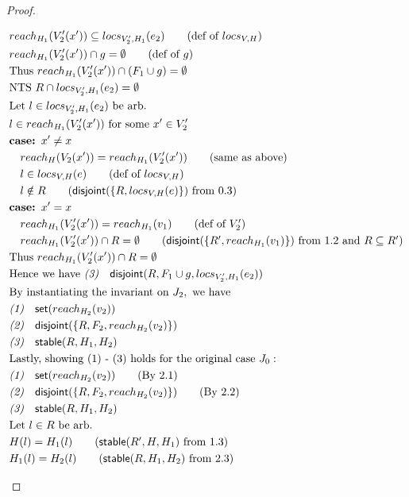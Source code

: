 \documentclass[sigconf]{acmart}
\newcommand{\ms}[1]{\ensuremath{\mathsf{#1}}}
\newcommand{\stable}[1]{\mathsf{stable}(#1)}
\newcommand{\dist}[1]{\mathsf{disjoint}(#1)}
\theoremstyle{definition}
\begin{document}
\begin{proof}
\begin{description}
\begin{align*}
  &reach_{H_1}(V_2'(x')) \subseteq locs_{V_2',H_1}(e_2) \tag{def of $locs_{V,H}$}\\
  &reach_{H_1}(V_2'(x')) \cap g = \emptyset \tag{def of $g$}\\
  &\text{Thus } reach_{H_1}(V_2'(x')) \cap (F_1 \cup g) = \emptyset\\
  &\text{NTS } R \cap locs_{V_2',H_1}(e_2) = \emptyset\\
  &\text{Let } l \in locs_{V_2',H_1}(e_2) \text{ be arb.}\\
  &l \in reach_{H_1}(V_2'(x')) \text{ for some } x' \in V_2'\\
  &\textbf{case: } x' \ne x\\
  &\quad reach_H(V_2(x')) = reach_{H_1}(V_2'(x')) \tag{same as above}\\
  &\quad l \in locs_{V,H}(e) \tag{def of $locs_{V,H}$}\\
  &\quad l \notin R \tag{$\dist{\{R,locs_{V,H}(e)\}}$ from 0.3}\\
  &\textbf{case: } x' = x\\
  &\quad reach_{H_1}(V_2'(x')) = reach_{H_1}(v_1) \tag{def of $V_2'$}\\
  &\quad reach_{H_1}(V_2'(x')) \cap R = \emptyset \tag{$\dist{\{R', reach_{H_1}(v_1)\}}$ from 1.2 and $R \subseteq R'$}\\
  &\text{Thus } reach_{H_1}(V_2'(x')) \cap R = \emptyset\\
  &\text{Hence we have }\emph{(3)}\quad \dist{R,F_1 \cup g,locs_{V_2',H_1}(e_2)}\\
  &\text{By instantiating the invariant on } J_2, \text{ we have }\\
  &\emph{(1)}\quad \ms{set}(reach_{H_2}(v_2))\\
  &\emph{(2)}\quad \dist{\{R,F_2,reach_{H_2}(v_2)\}}\\
  &\emph{(3)}\quad \stable{R,H_1,H_2}\\
  &\text{Lastly, showing (1) - (3) holds for the original case } J_0:\\
  &\emph{(1)}\quad \ms{set}(reach_{H_2}(v_2)) \tag{By 2.1}\\
  &\emph{(2)}\quad \dist{\{R,F_2,reach_{H_2}(v_2)\}} \tag{By 2.2}\\
  &\emph{(3)}\quad \stable{R,H_1,H_2}\\
  &\text{Let } l \in R \text{ be arb. }\\
  &H(l) = H_1(l) \tag{$\stable{R',H,H_1}$ from 1.3}\\
  &H_1(l) = H_2(l) \tag{$\stable{R,H_1,H_2}$ from 2.3}\\

\end{align*}
\end{description}
\end{proof}
\end{document}
